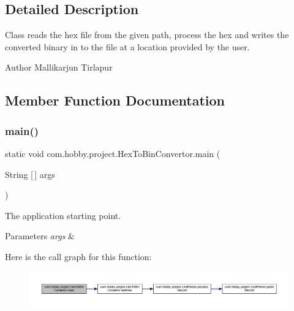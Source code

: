 \subsection{Detailed Description}
Class reads the hex file from the given path, process the hex and writes the converted binary in to the file at a location provided by the user.

\begin{DoxyAuthor}{Author}
Mallikarjun Tirlapur 
\end{DoxyAuthor}


\subsection{Member Function Documentation}
\mbox{\label{classcom_1_1hobby_1_1project_1_1_hex_to_bin_convertor_a5b0f6478c67aa0b3f03784f306bf30e5}} 
\subsubsection{\texorpdfstring{main()}{main()}}
{\footnotesize\ttfamily static void com.\+hobby.\+project.\+Hex\+To\+Bin\+Convertor.\+main (\begin{DoxyParamCaption}\item[{String \mbox{[}$\,$\mbox{]}}]{args }\end{DoxyParamCaption})\hspace{0.3cm}{\ttfamily [static]}}

The application starting point.


\begin{DoxyParams}{Parameters}
{\em args} & \\
\hline
\end{DoxyParams}
Here is the call graph for this function\+:
\nopagebreak
\begin{figure}[H]
\begin{center}
\leavevmode
\includegraphics[width=350pt]{classcom_1_1hobby_1_1project_1_1_hex_to_bin_convertor_a5b0f6478c67aa0b3f03784f306bf30e5_cgraph}
\end{center}
\end{figure}
\mbox{\label{classcom_1_1hobby_1_1project_1_1_hex_to_bin_convertor_aa8274cd08e200940cfe99c93292c5aec}} 
